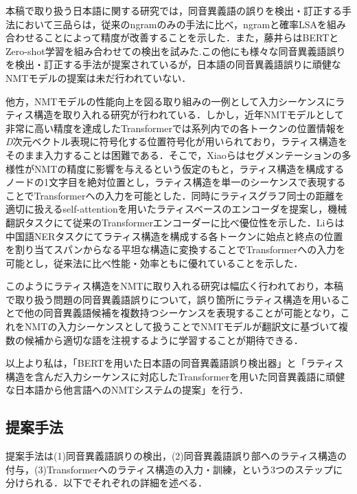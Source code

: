 \documentclass[a4j,10pt, twocolumn]{jarticle} \usepackage[dvipdfmx]{graphicx} \usepackage{amssymb} \usepackage{amsmath}
\begin{document}
本稿で取り扱う日本語に関する研究では，同音異義語の誤りを検出・訂正する手法において三品ら\cite{Mishina}は，従来のngramのみの手法に比べ，ngramと確率LSAを組み合わせることによって精度が改善することを示した．また，藤井ら\cite{Fujii}はBERTとZero-shot学習を組み合わせての検出を試みた.この他にも様々な同音異義語誤りを検出・訂正する手法が提案されているが，日本語の同音異義語誤りに頑健なNMTモデルの提案は未だ行われていない．

他方，NMTモデルの性能向上を図る取り組みの一例として入力シーケンスにラティス構造を取り入れる研究が行われている．しかし，近年NMTモデルとして非常に高い精度を達成したTransformerでは系列内での各トークンの位置情報を\textit{D}次元ベクトル表現に符号化する位置符号化が用いられており\cite{Vaswani}，ラティス構造をそのまま入力することは困難である\cite{Xiao}．そこで，Xiaoら\cite{Xiao}はセグメンテーションの多様性がNMTの精度に影響を与えるという仮定のもと，ラティス構造を構成するノードの1文字目を絶対位置とし，ラティス構造を単一のシーケンスで表現することでTransformerへの入力を可能とした．同時にラティスグラフ同士の距離を適切に扱えるself-attentionを用いたラティスベースのエンコーダを提案し，機械翻訳タスクにて従来のTransformerエンコーダーに比べ優位性を示した．Liら\cite{Li}は中国語NERタスクにてラティス構造を構成する各トークンに始点と終点の位置を割り当てスパンからなる平坦な構造に変換することでTransformerへの入力を可能とし，従来法に比べ性能・効率ともに優れていることを示した．

このようにラティス構造をNMTに取り入れる研究は幅広く行われており，本稿で取り扱う問題の同音異義語誤りについて，誤り箇所にラティス構造を用いることで他の同音異義語候補を複数持つシーケンスを表現することが可能となり，これをNMTの入力シーケンスとして扱うことでNMTモデルが翻訳文に基づいて複数の候補から適切な語を注視するように学習することが期待できる．

以上より私は，「BERTを用いた日本語の同音異義語誤り検出器」と「ラティス構造を含んだ入力シーケンスに対応したTransformerを用いた同音異義語に頑健な日本語から他言語へのNMTシステムの提案」を行う．

\subsection{提案手法}
提案手法は(1)同音異義語誤りの検出，(2)同音異義語誤り部へのラティス構造の付与，(3)Transformerへのラティス構造の入力・訓練，という3つのステップに分けられる．以下でそれぞれの詳細を述べる．
\end{document}
